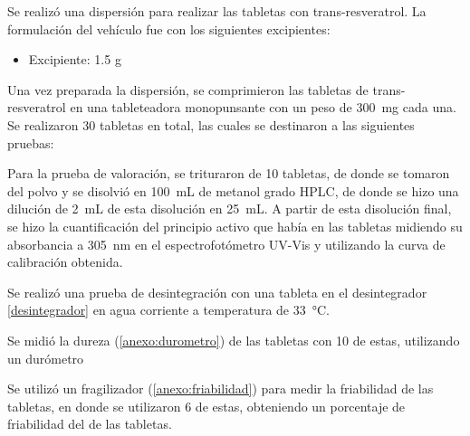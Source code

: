 Se realizó una dispersión para realizar las tabletas con trans-resveratrol. La formulación 
del vehículo fue con los siguientes excipientes:

\begin{multicols}{2}
    \begin{itemize}
        \item Excipiente: 1.5 g
    \end{itemize}
\end{multicols}

Una vez preparada la dispersión, se comprimieron las tabletas de trans-resveratrol
en una tableteadora monopunsante
con un peso de \SI{300}{\milli\gram} cada una. Se realizaron 30 tabletas en total,
las cuales se destinaron a las siguientes pruebas:

Para la prueba de valoración, se trituraron de 10 tabletas, de donde se tomaron %
del polvo y se disolvió en \SI{100}{\milli\liter} de metanol grado HPLC, 
de donde se hizo una dilución de \SI{2}{\milli\liter} de esta disolución
en \SI{25}{\milli\liter}. A partir de esta disolución final, se hizo la cuantificación
del principio activo que había en las tabletas midiendo su absorbancia a \SI{305}{\nano\meter}
en el espectrofotómetro UV-Vis
y utilizando la curva de calibración obtenida.

Se realizó una prueba de desintegración con una tableta en el desintegrador \ref{desintegrador} %
en agua corriente a temperatura de \SI{33}{\degreeCelsius}.

Se midió la dureza (\ref{anexo:durometro}) de las tabletas con 10 de estas, utilizando un durómetro %

Se utilizó un fragilizador (\ref{anexo:friabilidad}) %
para medir la friabilidad de las tabletas, en donde se utilizaron 6 de estas, obteniendo un porcentaje de friabilidad del %
de las tabletas.


